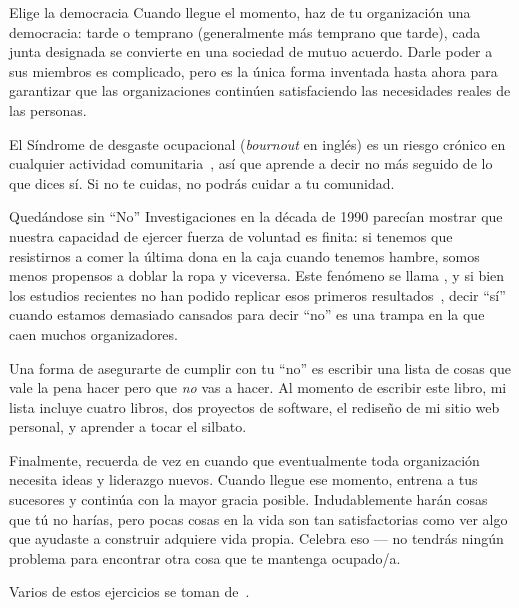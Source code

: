 \begin{aside}{Elige la democracia}
  Cuando llegue el momento, 
  haz de tu organización una democracia:
  tarde o temprano (generalmente más temprano que tarde), 
  cada junta designada se convierte en una sociedad de mutuo acuerdo.
  Darle poder a sus miembros es complicado, 
  pero es la única forma inventada hasta ahora para garantizar 
  que las organizaciones continúen satisfaciendo las necesidades reales de las personas.
\end{aside}


El Síndrome de desgaste ocupacional (\emph{bournout} en inglés) es un riesgo crónico en cualquier actividad comunitaria~\cite{Pign2016},
así que aprende a decir no más seguido de lo que dices sí.
Si no te cuidas,
no podrás cuidar a tu comunidad.

\begin{aside}{Quedándose sin ``No''}
  Investigaciones en la década de 1990 parecían mostrar que nuestra capacidad de ejercer fuerza de voluntad es finita:
  si tenemos que resistirnos a comer la última dona en la caja cuando tenemos hambre,
  somos menos propensos a doblar la ropa y viceversa.
  Este fenómeno se llama ,
  y si bien los estudios recientes no han podido replicar esos primeros resultados~\cite{Hagg2016},
  decir ``sí'' cuando estamos demasiado cansados para decir ``no''
  es una trampa en la que caen muchos organizadores.
\end{aside}

Una forma de asegurarte de cumplir con tu ``no'' 
es escribir una lista de cosas que vale la pena hacer 
pero que \emph{no} vas a hacer.
Al momento de escribir este libro, mi lista incluye cuatro libros, 
dos proyectos de software,
el rediseño de mi sitio web personal,
y aprender a tocar el silbato.

Finalmente,
recuerda de vez en cuando que
eventualmente toda organización necesita ideas y liderazgo nuevos.
Cuando llegue ese momento,
entrena a tus sucesores y continúa con la mayor gracia posible.
Indudablemente harán cosas que tú no harías,
pero pocas cosas en la vida son tan satisfactorias como
ver algo que ayudaste a construir adquiere vida propia.
Celebra eso --- no tendrás ningún problema para encontrar otra cosa que te mantenga ocupado/a.


Varios de estos ejercicios se toman de~\cite{Brow2007}.

